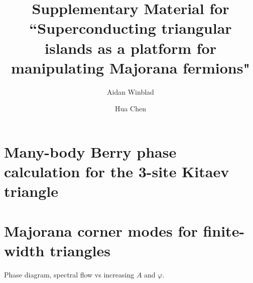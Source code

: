 \documentclass[aps,prb,showpacs,amsmath,amssymb,superscriptaddress]{revtex4-2}
\begin{document}
	
\title{Supplementary Material for ``Superconducting triangular islands as a platform for manipulating Majorana fermions"}
	
\author{Aidan Winblad}

\author{Hua Chen}

\maketitle

\section{Many-body Berry phase calculation for the 3-site Kitaev triangle}


\section{Majorana corner modes for finite-width triangles}

Phase diagram, spectral flow vs increasing $A$ and $\varphi$.




\end{document}
